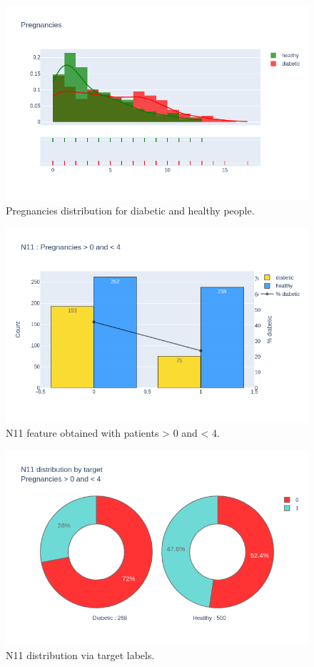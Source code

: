 \documentclass[12pt]{article}
\begin{document}
\begin{figure}[ht]
\centering
\includegraphics[width=1\textwidth]{newplot(36).png}
\caption{Pregnancies distribution for diabetic and healthy people.}
\end{figure}

\begin{figure}[ht]
\centering
\includegraphics[width=1\textwidth]{newplot(37).png}
\caption{N11 feature obtained with patients > 0 and < 4.}
\end{figure}

\begin{figure}[ht]
\centering
\includegraphics[width=1\textwidth]{newplot(38).png}
\caption{N11 distribution via target labels.}
\end{figure}
\end{document}
